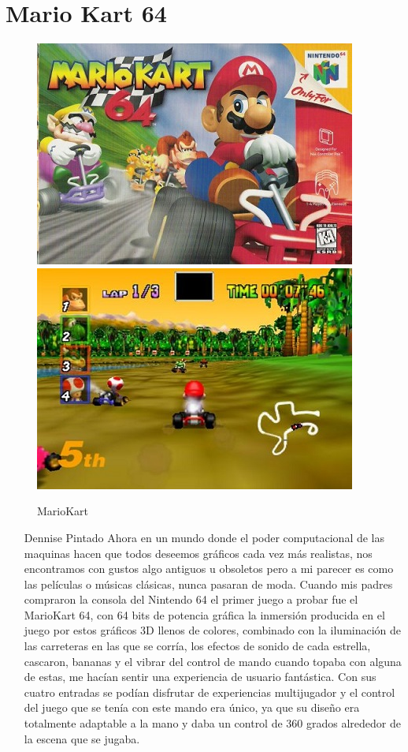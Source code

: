 \section{Mario Kart 64}

\begin{figure}[htbp]
\begin{center}
\includegraphics[width=.60\textwidth]{./imagenes/kart1.jpg} \includegraphics[width=.60\textwidth]{./imagenes/kart2.jpg} 
\caption{MarioKart}
\label{Mario Kart}
\end{center}
\end{figure}

\begin{itemize}
\item[Dennise Pintado] Ahora en un mundo donde el poder computacional de las maquinas hacen que todos deseemos  gráficos cada vez más realistas, nos encontramos con gustos algo antiguos u obsoletos pero a mi parecer es como las películas o músicas clásicas, nunca pasaran de moda. Cuando mis padres compraron la consola del Nintendo 64 el primer juego a probar fue el MarioKart 64,  con  64 bits de potencia gráfica la inmersión producida en el juego  por estos gráficos 3D llenos de colores, combinado con la iluminación de las carreteras en las que se corría, los efectos de sonido de cada estrella, cascaron, bananas  y el vibrar del control de mando cuando topaba con alguna de estas, me hacían sentir una experiencia de usuario fantástica. Con sus cuatro entradas se podían disfrutar de experiencias multijugador y el  control del juego que se tenía con este  mando era único, ya que su diseño era totalmente adaptable a la mano y daba un control de 360 grados alrededor de la escena que se jugaba.  
\end{itemize}
